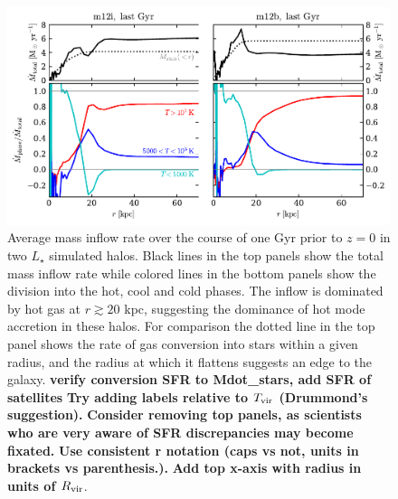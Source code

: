 \documentclass[fleqn,usenatbib]{mnras}
\newcommand{\Rvir}{R_{\rm vir}}
\begin{document}
\begin{figure}
    \centering
    \includegraphics{figures/Mdot_normalized.pdf}
    \caption{
    Average mass inflow rate over the course of one Gyr prior to $z=0$ in two $L_\star$ simulated halos.
    Black lines in the top panels show the total mass inflow rate while colored lines in the bottom panels show the division into the hot, cool and cold phases. 
    The inflow is dominated by hot gas at $r\gtrsim 20 $ kpc, suggesting the dominance of hot mode accretion in these halos.
    For comparison the dotted line in the top panel shows the rate of gas conversion into stars within a given radius, and the radius at which it flattens suggests an edge to the galaxy.
    \textbf{verify conversion SFR to Mdot\_stars, add SFR of satellites}
    \textbf{Try adding labels relative to $T_{\rm vir}$ (Drummond's suggestion).}
    \textbf{Consider removing top panels, as scientists who are very aware of SFR discrepancies may become fixated.}
    \textbf{Use consistent r notation (caps vs not, units in brackets vs parenthesis.).}
    \textbf{Add top x-axis with radius in units of $\Rvir$}.
    }
    \label{f: Mdot}
\end{figure}
\end{document}
